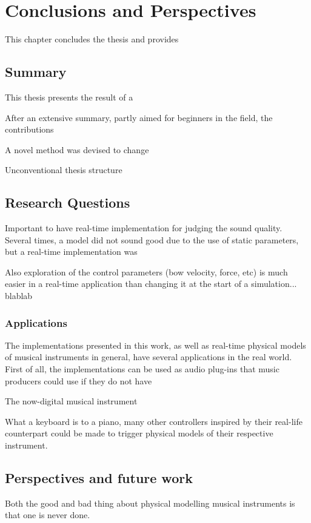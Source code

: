 \chapter{Conclusions and Perspectives}\label{ch:conclusion}
This chapter concludes the thesis and provides 



\section{Summary}
This thesis presents the result of a 

After an extensive summary, partly aimed for beginners in the field, the contributions 

A novel method was devised to change


Unconventional thesis structure
\section{Research Questions}


Important to have real-time implementation for judging the sound quality. Several times, a model did not sound good due to the use of static parameters, but a real-time implementation was 

Also exploration of the control parameters (bow velocity, force, etc) is much easier in a real-time application than changing it at the start of a simulation... blablab

\subsection{Applications}
The implementations presented in this work, as well as real-time physical models of musical instruments in general, have several applications in the real world. First of all, the implementations can be used as audio plug-ins that music producers could use if they do not have


The now-digital musical instrument 

What a keyboard is to a piano, many other controllers inspired by their real-life counterpart could be made to trigger physical models of their respective instrument.


\section{Perspectives and future work}
Both the good and bad thing about physical modelling musical instruments is that one is never done. 

